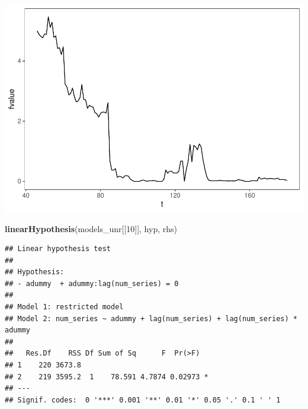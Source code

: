 \documentclass[
]{article}
\newenvironment{Shaded}{\begin{snugshade}}{\end{snugshade}}
\newcommand{\DataTypeTok}[1]{\textcolor[rgb]{0.13,0.29,0.53}{#1}}
\newcommand{\DecValTok}[1]{\textcolor[rgb]{0.00,0.00,0.81}{#1}}
\newcommand{\KeywordTok}[1]{\textcolor[rgb]{0.13,0.29,0.53}{\textbf{#1}}}
\newcommand{\NormalTok}[1]{#1}
\newcommand{\OperatorTok}[1]{\textcolor[rgb]{0.81,0.36,0.00}{\textbf{#1}}}
\newcommand{\StringTok}[1]{\textcolor[rgb]{0.31,0.60,0.02}{#1}}
\begin{document}
\begin{Shaded}
\end{Shaded}

\begin{center}\includegraphics{Econo2_P7_files/figure-latex/all-5} \end{center}

\begin{Shaded}
\begin{Highlighting}[]
\KeywordTok{linearHypothesis}\NormalTok{(models_unr[[}\DecValTok{10}\NormalTok{]], hyp, rhs)}
\end{Highlighting}
\end{Shaded}

\begin{verbatim}
## Linear hypothesis test
## 
## Hypothesis:
## - adummy  + adummy:lag(num_series) = 0
## 
## Model 1: restricted model
## Model 2: num_series ~ adummy + lag(num_series) + lag(num_series) * adummy
## 
##   Res.Df    RSS Df Sum of Sq      F  Pr(>F)  
## 1    220 3673.8                              
## 2    219 3595.2  1    78.591 4.7874 0.02973 *
## ---
## Signif. codes:  0 '***' 0.001 '**' 0.01 '*' 0.05 '.' 0.1 ' ' 1
\end{verbatim}
\end{document}
